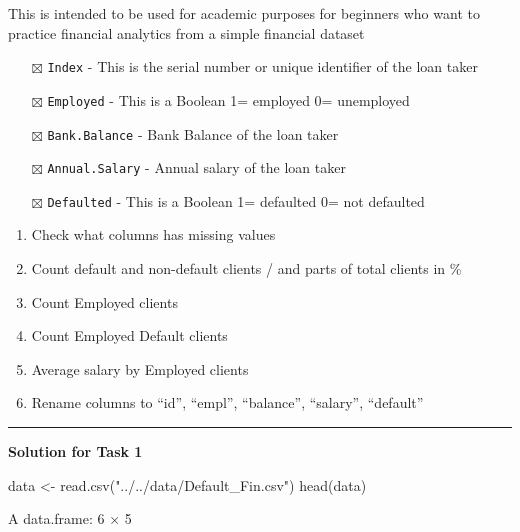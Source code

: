 \documentclass[
  letterpaper,
  DIV=11,
  numbers=noendperiod]{scrreprt}
\newenvironment{Shaded}{\begin{snugshade}}{\end{snugshade}}
\newcommand{\FunctionTok}[1]{\textcolor[rgb]{0.28,0.35,0.67}{#1}}
\newcommand{\NormalTok}[1]{\textcolor[rgb]{0.00,0.23,0.31}{#1}}
\newcommand{\OtherTok}[1]{\textcolor[rgb]{0.00,0.23,0.31}{#1}}
\newcommand{\StringTok}[1]{\textcolor[rgb]{0.13,0.47,0.30}{#1}}
\providecommand{\tightlist}{%
  \setlength{\itemsep}{0pt}\setlength{\parskip}{0pt}}\usepackage{longtable,booktabs,array}
\begin{document}
This is intended to be used for academic purposes for beginners who want
to practice financial analytics from a simple financial dataset

\begin{itemize}
\tightlist
\item[$\boxtimes$]
  \texttt{Index} - This is the serial number or unique identifier of the
  loan taker
\item[$\boxtimes$]
  \texttt{Employed} - This is a Boolean 1= employed 0= unemployed
\item[$\boxtimes$]
  \texttt{Bank.Balance} - Bank Balance of the loan taker
\item[$\boxtimes$]
  \texttt{Annual.Salary} - Annual salary of the loan taker\\
\item[$\boxtimes$]
  \texttt{Defaulted} - This is a Boolean 1= defaulted 0= not defaulted
\end{itemize}

\begin{enumerate}
\def\labelenumi{\arabic{enumi}.}
\tightlist
\item
  Check what columns has missing values
\item
  Count default and non-default clients / and parts of total clients in
  \%
\item
  Count Employed clients
\item
  Count Employed Default clients
\item
  Average salary by Employed clients
\item
  Rename columns to ``id'', ``empl'', ``balance'', ``salary'',
  ``default''
\end{enumerate}

\begin{center}\rule{0.5\linewidth}{0.5pt}\end{center}

\textbf{Solution for Task 1}

\begin{Shaded}
\begin{Highlighting}[]
\NormalTok{data }\OtherTok{\textless{}{-}} \FunctionTok{read.csv}\NormalTok{(}\StringTok{"../../data/Default\_Fin.csv"}\NormalTok{)}
\FunctionTok{head}\NormalTok{(data)}
\end{Highlighting}
\end{Shaded}

A data.frame: 6 × 5
\end{document}
